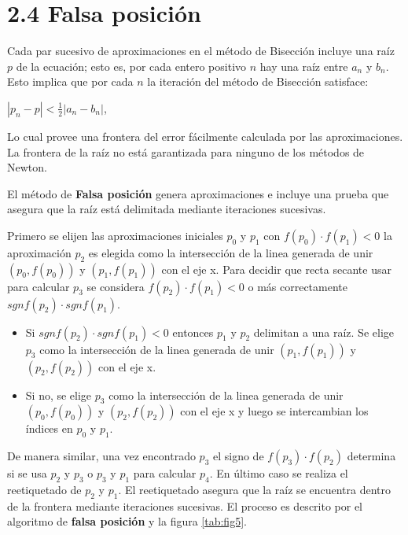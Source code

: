 \section*{2.4 Falsa posición}

Cada par sucesivo de aproximaciones en el método de Bisección incluye una raíz $p$ de la ecuación; esto es, por cada entero positivo $n$ hay una raíz entre $a_n$ y $b_n$. Esto implica que por cada $n$ la iteración del método de Bisección satisface:

\begin{center}
    $|p_n-p|<\frac{1}{2}|a_n-b_n|$,
\end{center}

Lo cual provee una frontera del error fácilmente calculada por las aproximaciones.
La frontera de la raíz no está garantizada para ninguno de los métodos de Newton.

El método de \textbf{Falsa posición} genera aproximaciones e incluye una prueba que asegura que la raíz está delimitada mediante iteraciones sucesivas. 

Primero se elijen las aproximaciones iniciales $p_0$ y $p_1$ con $f(p_0)\cdot f(p_1)<0$ la aproximación $p_2$ es elegida como la intersección de la linea generada de unir $(p_0,f(p_0))$ y $(p_1,f(p_1))$ con el eje x. Para decidir que recta secante usar para calcular $p_3$ se considera $f(p_2)\cdot f(p_1)<0$ o más correctamente $sgnf(p_2)\cdot sgnf(p_1)$.

\begin{itemize}
    \item Si $sgnf(p_2)\cdot sgnf(p_1)<0$ entonces $p_1$ y $p_2$ delimitan a una raíz. Se elige $p_3$ como la intersección de la linea generada de unir $(p_1,f(p_1))$ y $(p_2,f(p_2))$ con el eje x.
    \item Si no, se elige $p_3$ como la intersección de la linea generada de unir $(p_0,f(p_0))$ y $(p_2,f(p_2))$ con el eje x y luego se intercambian los índices en $p_0$ y $p_1$.
\end{itemize}

De manera similar, una vez encontrado $p_3$ el signo de $f(p_3)\cdot f(p_2)$ determina si se usa $p_2$ y $p_3$ o $p_3$ y $p_1$ para calcular $p_4$. En último caso se realiza el reetiquetado de $p_2$ y $p_1$. El reetiquetado asegura que la raíz se encuentra dentro de la frontera mediante iteraciones sucesivas. El proceso es descrito por el algoritmo de \textbf{falsa posición} y la figura \ref{tab:fig5}.

